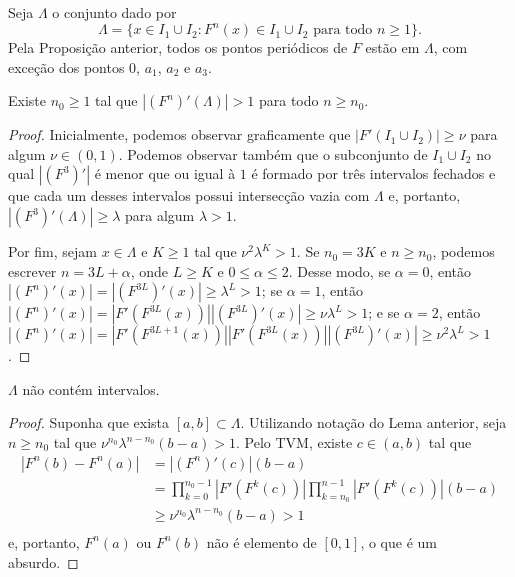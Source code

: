 Seja $\Lambda$ o conjunto dado por
$$\Lambda = \lbrace x \in I_1 \cup I_2 : F^n(x) \in I_1 \cup I_2 \text{ para todo } n \geq 1 \rbrace.$$
Pela Proposição anterior, todos os pontos periódicos de $F$ estão em $\Lambda$, com exceção dos pontos $0$, $a_1$, $a_2$ e $a_3$.

\begin{lemma}
Existe $n_0 \geq 1$ tal que $|(F^n)'(\Lambda)| > 1$ para todo $n \geq n_0$.
\end{lemma}

\begin{proof}
Inicialmente, podemos observar graficamente que $|F'(I_1 \cup I_2)| \geq \nu$ para algum $\nu \in (0, 1)$.
Podemos observar também que o subconjunto de $I_1 \cup I_2$ no qual $|(F^3)'|$ é menor que ou igual à $1$ é formado por três intervalos fechados e que cada um desses intervalos possui intersecção vazia com $\Lambda$ e, portanto, $|(F^3)'(\Lambda)| \geq \lambda$ para algum $\lambda > 1$.

Por fim, sejam $x \in \Lambda$ e $K \geq 1$ tal que $\nu^2 \lambda^K > 1$. Se $n_0 = 3K$ e $n \geq n_0$, podemos escrever $n = 3L + \alpha$, onde $L \geq K$ e $0 \leq \alpha \leq 2$. Desse modo, se $\alpha = 0$, então $ \left| (F^n)'(x) \right|
= \left| (F^{3L})'(x) \right|
\geq \lambda^L > 1$; se $\alpha = 1$, então $ \left| (F^n)'(x) \right| = \left| F'(F^{3L}(x)) \right| \left| (F^{3L})'(x)\right|
\geq \nu \lambda^L > 1$; e se $\alpha = 2$, então $ \left| (F^n)'(x) \right| = \left| F' (F^{3L+1}(x)) \right| \left| F' (F^{3L}(x)) \right| \left| (F^{3L})'(x) \right|
\geq \nu^2 \lambda^L > 1$.
\end{proof}

\begin{lemma}
$\Lambda$ não contém intervalos.
\end{lemma}

\begin{proof}
Suponha que exista $[a, b] \subset \Lambda$. Utilizando notação do Lema anterior, seja $n \geq n_0$ tal que $\nu^{n_0} \lambda^{n - n_0} (b - a) > 1$. Pelo TVM, existe $c \in (a, b)$ tal que
\begin{align*}
|F^n(b) - F^n(a)| & = |(F^n)'(c)|(b-a) \\
& = \prod_{k=0}^{n_0-1} |F'(F^k(c))| \prod_{k=n_0}^{n-1} |F'(F^k(c))| (b-a) \\
& \geq \nu^{n_0} \lambda^{n-n_0} (b-a) > 1 \\
\end{align*}
e, portanto, $F^n(a)$ ou $F^n(b)$ não é elemento de $[0,1]$, o que é um absurdo.
\end{proof}

